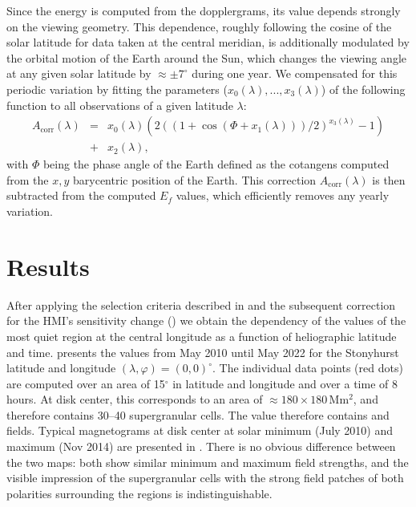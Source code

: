 \documentclass{aa}
\begin{document}
Since the \fff
energy
is computed from the \los{} dopplergrams, its value depends strongly on the viewing geometry. This dependence,  roughly following the cosine of the solar latitude for data taken at the central meridian, is additionally modulated by the orbital motion of the Earth around the Sun, which changes the viewing angle at any given solar latitude by $\approx\pm7^\circ$ during one year. We compensated for this periodic variation by fitting the parameters ($x_0(\lambda), ..., x_3(\lambda)$) of the following function to all observations of a given latitude $\lambda$:
\begin{eqnarray}
\label{eq:orbitcorr}
A_{\mbox{corr}}(\lambda) &=& x_0(\lambda) (  2 ( (1+\cos(\Phi+x_1(\lambda)))/2)^{x_3(\lambda)}-1   )\nonumber \\
&+&x_2(\lambda),
\end{eqnarray}
with $\Phi$ being the phase angle of the Earth defined as the cotangens computed from the $x,y$ barycentric position of the Earth.
This correction $A_{\mbox{corr}}(\lambda)$ is then subtracted from the computed 
$E_f$ values, which efficiently removes any yearly variation. 

\section{Results}\label{results}

After applying the selection criteria described in  and the subsequent correction for the 
HMI's
sensitivity change () we obtain the dependency of the \brms{} values of the most quiet region at the central longitude as a function of heliographic latitude and time.  presents the \brms{} values from May 2010 until May 2022 for the 
Stonyhurst latitude and longitude $(\lambda,\varphi) = (0,0)^\circ$.
The individual data points (red dots) are computed over an area of 15$^\circ$ in latitude and longitude and over a time of 8 hours. At disk center, this corresponds to an area of $\approx 180 \times 180$\,Mm$^2$, and therefore contains 30--40 supergranular cells. The \brms{} value therefore contains
\NW{} and \IN{} fields.
Typical magnetograms at disk center at solar minimum (July 2010) and maximum (Nov 2014) are presented in . There is no obvious difference between the two maps: both show similar minimum and maximum field strengths, and the visible impression of the supergranular cells with the strong field patches of both polarities surrounding the \IN{} regions is indistinguishable.
\end{document}
